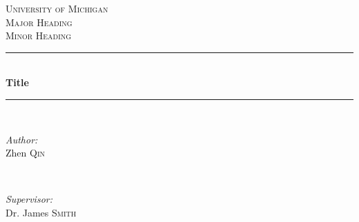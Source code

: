 \begin{titlepage}

\newcommand{\HRule}{\rule{\linewidth}{0.5mm}} %

\center %
 

\textsc{\LARGE University of Michigan}\\[1.5cm] %
\textsc{\Large Major Heading}\\[0.5cm] %
\textsc{\large Minor Heading}\\[0.5cm] %


\HRule \\[0.4cm]
{ \huge \bfseries Title}\\[0.4cm] %
\HRule \\[1.5cm]
 

\begin{minipage}{0.4\textwidth}
\begin{flushleft} \large
\emph{Author:}\\
Zhen \textsc{Qin} %
\end{flushleft}
\end{minipage}
~
\begin{minipage}{0.4\textwidth}
\begin{flushright} \large
\emph{Supervisor:} \\
Dr. James \textsc{Smith} %
\end{flushright}
\end{minipage}\\[2cm]



\end{titlepage}
